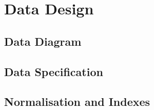 \section{Data Design}\label{data-design}

\subsection{Data Diagram}\label{data-erd}



\subsection{Data Specification}\label{data-specifications}





\subsection{Normalisation and Indexes}\label{data-normalisation-indexes}


